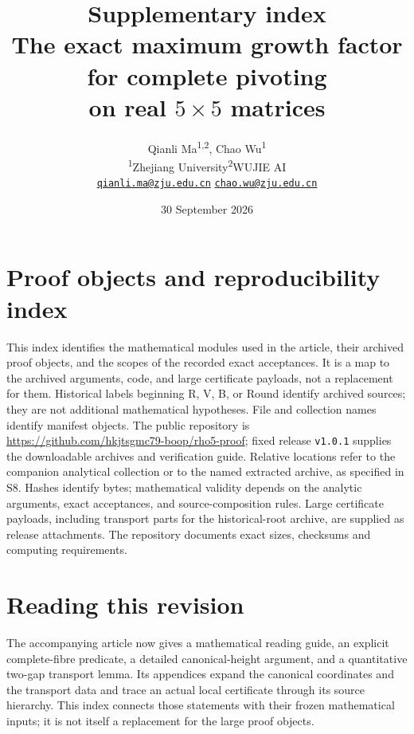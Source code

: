 \documentclass[10pt]{article}
\title{Supplementary index\\[3pt]\large The exact maximum growth factor for complete pivoting\\on real \(5\times5\) matrices}
\author{Qianli Ma\textsuperscript{1,2}, Chao Wu\textsuperscript{1}\\[3pt]
\small \textsuperscript{1}Zhejiang University\quad\textsuperscript{2}WUJIE AI\\[3pt]
\small \href{mailto:qianli.ma@zju.edu.cn}{\texttt{qianli.ma@zju.edu.cn}}\quad
\href{mailto:chao.wu@zju.edu.cn}{\texttt{chao.wu@zju.edu.cn}}}
\date{30 September 2026}
\begin{document}
\maketitle
\section*{Proof objects and reproducibility index}

This index identifies the mathematical modules used in the article,
their archived proof objects, and the scopes of the recorded exact
acceptances. It is a map to the archived arguments, code, and large
certificate payloads, not a replacement for them.
Historical labels beginning R, V, B, or Round identify archived sources;
they are not additional mathematical hypotheses. File and collection
names identify manifest objects. The public repository is
\url{https://github.com/hkjtsgmc79-boop/rho5-proof}; fixed release
\texttt{v1.0.1} supplies the downloadable archives and verification guide.
Relative locations refer to
the companion analytical collection or to the named extracted archive,
as specified in S8. Hashes identify bytes; mathematical validity depends
on the analytic arguments, exact acceptances, and source-composition
rules. Large certificate payloads, including transport parts for the
historical-root archive, are supplied as release attachments. The
repository documents exact sizes, checksums and computing requirements.

\section*{Reading this revision}
The accompanying article now gives a mathematical reading guide, an
explicit complete-fibre predicate, a detailed canonical-height argument,
and a quantitative two-gap transport lemma. Its appendices expand the
canonical coordinates and the transport data and trace an actual local
certificate through its source hierarchy. This index connects those
statements with their frozen mathematical inputs; it is not itself a
replacement for the large proof objects.
\end{document}
